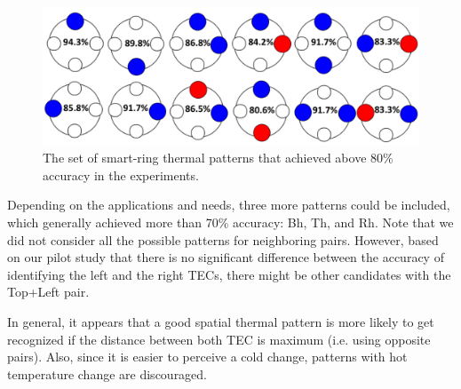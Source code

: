 \documentclass[preprint,12pt]{elsarticle}
\begin{document}
\begin{figure}[tp]
  \centering
  \includegraphics[width=0.9\columnwidth]{img/fig14.png}
  \caption{The set of smart-ring thermal patterns that achieved above 80\% accuracy in the experiments.}
  \label{fig:14}
\end{figure}

Depending on the applications and needs, three more patterns could be included, which generally achieved more than 70\% accuracy: Bh, Th, and Rh. Note that we did not consider all the possible patterns for neighboring pairs. However, based on our pilot study that there is no significant difference between the accuracy of identifying the left and the right TECs, there might be other candidates with the Top+Left pair.

In general, it appears that a good spatial thermal pattern is more likely to get recognized if the distance between both TEC is maximum (i.e. using opposite pairs). Also, since it is easier to perceive a cold change, patterns with hot temperature change are discouraged.
\end{document}
